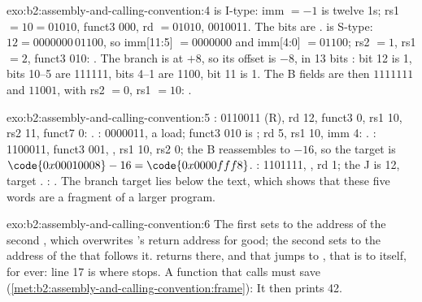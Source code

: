 \begin{solution}{exo:b2:assembly-and-calling-convention:4}
 is I-type: imm $= -1$ is twelve 1s; rs1 $= 10 = 01010$, funct3 000, rd $= 01010$, 
0010011. The bits  are .
 is S-type: $12 = 0000000\,01100$, so imm[11:5] $= 0000000$ and imm[4:0] $= 01100$; rs2 $= 1$,
rs1 $= 2$, funct3 010: . The branch is at  $+ 8$, so its offset is $-8$, in 13 bits
: bit 12 is 1, bits 10--5 are 111111, bits 4--1 are 1100, bit 11 is 1. The B fields are
then $1111111$ and $11001$, with rs2 $= 0$, rs1 $= 10$: .
\end{solution}

\begin{solution}{exo:b2:assembly-and-calling-convention:5}
:  0110011 (R), rd 12, funct3 0, rs1 10, rs2 11, funct7 0: .
:  0000011, a load; funct3 010 is ; rd 5, rs1 10, imm 4: .
:  1100011, funct3 001, , rs1 10, rs2 0; the B  reassembles to $-16$, so the
target is $\code{0x00010008} - 16 = \code{0x0000fff8}$. :  1101111, , rd 1; the J
 is 12, target . : . The branch target lies below the
text, which shows that these five words are a fragment of a larger program.
\end{solution}

\begin{solution}{exo:b2:assembly-and-calling-convention:6}
The first  sets  to the address of the second , which overwrites 's
return address for good; the second  sets  to the address of the  that follows
it.  returns there, and that  jumps to , that is to itself, for ever: line 17 is where
 stops. A function that calls must save  (\cref{met:b2:assembly-and-calling-convention:frame}):
It then prints 42.
\end{solution}

